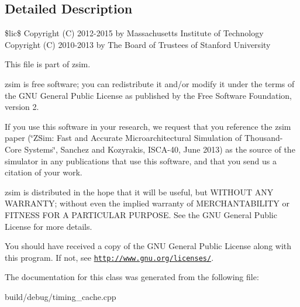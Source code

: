 \subsection{Detailed Description}
\$lic\$ Copyright (C) 2012-\/2015 by Massachusetts Institute of Technology Copyright (C) 2010-\/2013 by The Board of Trustees of Stanford University

This file is part of zsim.

zsim is free software; you can redistribute it and/or modify it under the terms of the G\-N\-U General Public License as published by the Free Software Foundation, version 2.

If you use this software in your research, we request that you reference the zsim paper (\char`\"{}\-Z\-Sim\-: Fast and Accurate Microarchitectural Simulation of
\-Thousand-\/\-Core Systems\char`\"{}, Sanchez and Kozyrakis, I\-S\-C\-A-\/40, June 2013) as the source of the simulator in any publications that use this software, and that you send us a citation of your work.

zsim is distributed in the hope that it will be useful, but W\-I\-T\-H\-O\-U\-T A\-N\-Y W\-A\-R\-R\-A\-N\-T\-Y; without even the implied warranty of M\-E\-R\-C\-H\-A\-N\-T\-A\-B\-I\-L\-I\-T\-Y or F\-I\-T\-N\-E\-S\-S F\-O\-R A P\-A\-R\-T\-I\-C\-U\-L\-A\-R P\-U\-R\-P\-O\-S\-E. See the G\-N\-U General Public License for more details.

You should have received a copy of the G\-N\-U General Public License along with this program. If not, see \href{http://www.gnu.org/licenses/}{\tt http\-://www.\-gnu.\-org/licenses/}. 

The documentation for this class was generated from the following file\-:\begin{DoxyCompactItemize}
\item 
build/debug/timing\-\_\-cache.\-cpp\end{DoxyCompactItemize}
